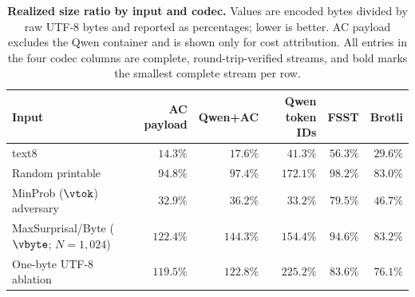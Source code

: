 \begin{table}[!htbp] %
\centering
\caption{\textbf{Realized size ratio by input and codec.} Values are encoded bytes divided by raw UTF-8 bytes and reported as percentages; lower is better. AC payload excludes the Qwen container and is shown only for cost attribution. All entries in the four codec columns are complete, round-trip-verified streams, and bold marks the smallest complete stream per row.}
\label{tab:codec-comparison}
\small
\setlength{\tabcolsep}{3.4pt}
\begin{tabular}{lrrrrr}
\toprule
Input & AC payload & Qwen+AC & Qwen token IDs & FSST & Brotli \\
\midrule
text8                    & $14.3\%$ & \textbf{$17.6\%$} & $41.3\%$ & $56.3\%$ & $29.6\%$ \\
Random printable         & $94.8\%$ & $97.4\%$ & $172.1\%$ & $98.2\%$ & \textbf{$83.0\%$} \\
MinProb ($\vtok$) adversary         & $32.9\%$ & $36.2\%$ & \textbf{$33.2\%$} & $79.5\%$ & $46.7\%$ \\
MaxSurprisal/Byte ($\vbyte$; $N=1{,}024$) & $122.4\%$ & $144.3\%$ & $154.4\%$ & $94.6\%$ & \textbf{$83.2\%$} \\
One-byte UTF-8 ablation & $119.5\%$ & $122.8\%$ & $225.2\%$ & $83.6\%$ & \textbf{$76.1\%$} \\
\bottomrule
\end{tabular}
\end{table}
